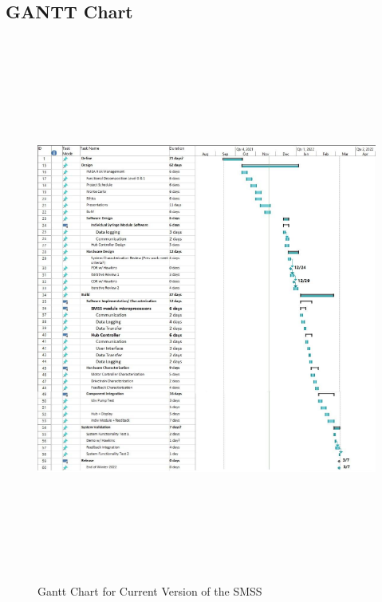 \documentclass[journal]{IEEEtran}
\begin{document}
    \subsection{GANTT Chart}
        \begin{figure}[H]
            \centering
            \includegraphics[width = 18cm, height = 18cm]{Gantt}
            \caption{Gantt Chart for Current Version of the SMSS}
            \label{fig:Gantt}
        \end{figure}
        
        \newpage
        \quad
        \newpage
    
\end{document}
